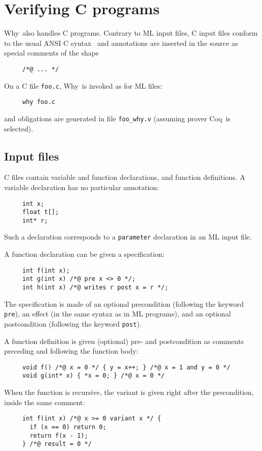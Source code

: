 \documentclass[a4paper,12pt]{report}
\makeatletter
\newcommand{\coq}{\textsf{Coq}\index{Coq@\textsf{Coq}}}
\newcommand{\why}{\textsf{Why}}
\makeatother
\begin{document}

\section{Verifying C programs}
\label{tutorial:C}

\why\ also handles C programs.
Contrary to ML input files, C input files conform to the usual ANSI C
syntax~\cite{KR88} and annotations are inserted in the source as
special comments of the shape 
\begin{verbatim}
     /*@ ... */
\end{verbatim}
On a C file \texttt{foo.c}, \why\ is invoked as for ML files:
\begin{verbatim}
     why foo.c
\end{verbatim}
and obligations are generated in file \texttt{foo\_why.v} (assuming prover
\coq\ is selected).

\subsection{Input files}

C files contain variable and function declarations, and function
definitions. 
A variable declaration has no particular annotation:
\begin{verbatim}
     int x;
     float t[];
     int* r;
\end{verbatim}
Such a declaration corresponds to a \texttt{parameter} declaration in
an ML input file.

A function declaration can be given a specification:
\begin{verbatim}
     int f(int x);
     int g(int x) /*@ pre x <> 0 */;
     int h(int x) /*@ writes r post x = r */;
\end{verbatim}
The specification is made of an optional precondition (following
the keyword \texttt{pre}), an effect (in the same syntax as in ML
programs), and an optional postcondition (following the keyword
\texttt{post}). 

A function definition is given (optional) pre- and postcondition as
comments preceding and following the function body:
\begin{verbatim}
     void f() /*@ x = 0 */ { y = x++; } /*@ x = 1 and y = 0 */
     void g(int* x) { *x = 0; } /*@ x = 0 */
\end{verbatim}
When the function is recursive, the variant is given right after the
precondition, inside the same comment:
\begin{verbatim}
     int f(int x) /*@ x >= 0 variant x */ {
       if (x == 0) return 0;
       return f(x - 1);
     } /*@ result = 0 */
\end{verbatim}
\end{document}
